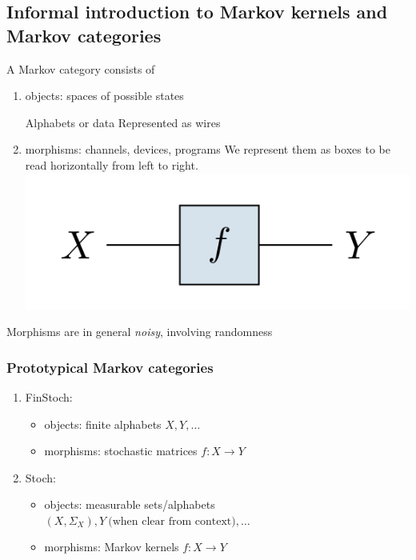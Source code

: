 % 
%
%

\subsection{Informal introduction to Markov kernels and Markov categories}

\begin{frame}
    A Markov category consists of
    \begin{enumerate}
        \item objects: spaces of possible states\par
            Alphabets or data
            Represented as wires
        \item morphisms: channels, devices, programs
            We represent them as boxes to be read horizontally from left to right.
            \includegraphics[width=.4\textwidth]{graphics/string/markov_morphism.png}
    \end{enumerate}
    Morphisms are in general \emph{noisy}, involving randomness
\end{frame}

\begin{frame}
    \frametitle{Prototypical Markov categories}
    \begin{enumerate}
        \item FinStoch: 
            \begin{itemize}
                \item objects: finite alphabets $X, Y, \dots$
                \item morphisms: stochastic matrices $f: X\to Y$
            \end{itemize}
        \item Stoch: 
            \begin{itemize}
                \item objects: measurable sets/alphabets $(X, \Sigma_X), Y\ \text{(when clear from context)}, \dots$
                \item morphisms: Markov kernels $f: X\to Y$
            \end{itemize}
    \end{enumerate}
\end{frame}

